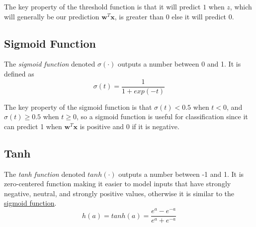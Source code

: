 \documentclass[12pt]{article}
\begin{document}
        The key property of the threshold function is that it will predict $1$ when $z$, which will generally be our
        prediction $\boldsymbol{w}^T\boldsymbol{x}$, is greater than $0$ else it will predict $0$.

    \subsection{Sigmoid Function} \label{sec:Sigmoid}
        The \textit{sigmoid function} denoted $\sigma(\cdot)$ outputs a number between 0 and 1. It is defined as
        $$ \sigma(t) = \frac{1}{1 + exp(-t)} $$


        The key property of the sigmoid function is that $\sigma(t) < 0.5$ when $t < 0$, and $\sigma(t) \geq 0.5$ when
        $t \geq 0$, so a sigmoid function is useful for classification since it can predict 1 when
        $\boldsymbol{w}^T\boldsymbol{x}$ is positive and 0 if it is negative.

    \subsection{Tanh} \label{sec:Tanh}
        The \textit{tanh function} denoted $tanh(\cdot)$ outputs a number between -1 and 1. It is zero-centered function making it easier to
        model inputs that have strongly negative, neutral, and strongly positive values, otherwise it is similar to the \hyperref[sec:Sigmoid]{sigmoid
        function}.
        $$ h(a) = tanh(a) = \frac{e^a - e^{-a}}{e^a + e^{-a}} $$

\end{document}
